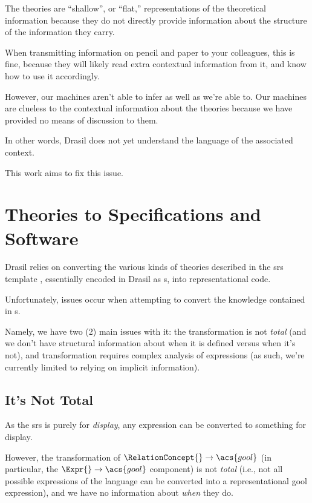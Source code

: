 The theories are ``shallow'', or ``flat,'' representations of the theoretical
information because they do not directly provide information about the structure
of the information they carry.

When transmitting information on pencil and paper to your colleagues, this is
fine, because they will likely read extra contextual information from it, and
know how to use it accordingly.

However, our machines aren't able to infer as well as we're able to. Our
machines are clueless to the contextual information about the theories because
we have provided no means of discussion to them.

In other words, Drasil does not yet understand the language of the associated
context.

This work aims to fix this issue.




\section{Theories to Specifications and Software}

Drasil relies on converting the various kinds of theories described in the
\acs{srs} template \cite{SmithAndLai2005}, essentially encoded in Drasil as
\RelationConcept{}s, into representational code.


Unfortunately, issues occur when attempting to convert the knowledge contained
in \RelationConcept{}s.

Namely, we have two (2) main issues with it: the transformation is not
\textit{total} (and we don't have structural information about when it is
defined versus when it's not), and transformation requires complex analysis of
expressions (as such, we're currently limited to relying on implicit
information).



\subsection{It's Not Total}



As the \acs{srs} is purely for \textit{display}, any \Expr{} expression can be
converted to something for display.

However, the transformation of \(\RelationConcept{} \rightarrow \acs{gool}\) (in
particular, the \(\Expr{} \rightarrow \acs{gool}\) component) is not
\textit{total} (i.e., not all possible expressions of the \Expr{} language can
be converted into a representational \acs{gool} expression), and we have no
information about \textit{when} they do.

